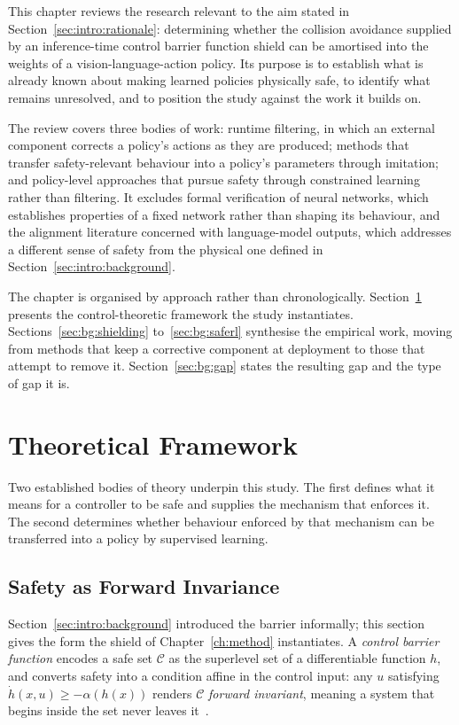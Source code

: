 \documentclass[a4paper,11pt]{report}
\begin{document}
This chapter reviews the research relevant to the aim stated in
Section~\ref{sec:intro:rationale}: determining whether the collision avoidance supplied by an
inference-time control barrier function shield can be amortised into the weights of a
vision-language-action policy. Its purpose is to establish what is already known about making
learned policies physically safe, to identify what remains unresolved, and to position the study
against the work it builds on.

The review covers three bodies of work: runtime filtering, in which an external component corrects
a policy's actions as they are produced; methods that transfer safety-relevant behaviour into a
policy's parameters through imitation; and policy-level approaches that pursue safety through
constrained learning rather than filtering. It excludes formal verification of neural networks,
which establishes properties of a fixed network rather than shaping its behaviour, and the
alignment literature concerned with language-model outputs, which addresses a different sense of
safety from the physical one defined in Section~\ref{sec:intro:background}.

The chapter is organised by approach rather than chronologically. Section~\ref{sec:bg:cbf}
presents the control-theoretic framework the study instantiates. Sections~\ref{sec:bg:shielding}
to~\ref{sec:bg:saferl} synthesise the empirical work, moving from methods that keep a corrective
component at deployment to those that attempt to remove it.
Section~\ref{sec:bg:gap} states the resulting gap and the type of gap it is.

\section{Theoretical Framework}\label{sec:bg:cbf}

Two established bodies of theory underpin this study. The first defines what it means for a
controller to be safe and supplies the mechanism that enforces it. The second determines whether
behaviour enforced by that mechanism can be transferred into a policy by supervised learning.

\subsection{Safety as Forward Invariance}

Section~\ref{sec:intro:background} introduced the barrier informally; this section gives the form
the shield of Chapter~\ref{ch:method} instantiates. A \emph{control barrier function} encodes a
safe set $\mathcal{C}$ as the superlevel set of a differentiable function $h$, and converts safety
into a condition affine in the control input: any $u$ satisfying
$\dot{h}(x,u) \ge -\alpha(h(x))$ renders $\mathcal{C}$ \emph{forward invariant}, meaning a system
that begins inside the set never leaves it~\cite{ames2017cbf}.
\end{document}
